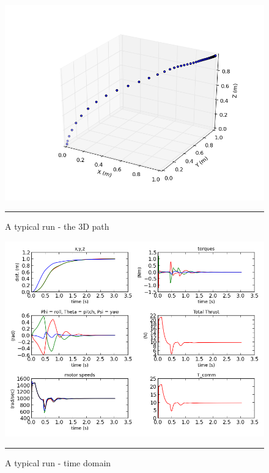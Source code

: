 \begin{figure}[htbp]
	\centering
		\includegraphics[width=\textwidth]{Figures/typical_run_time_3D_path.png}
		\rule{35em}{0.5pt}
	\caption[typical run 3D path]{A typical run - the 3D path}
	\label{fig:typical run 3D path}
\end{figure}

\begin{figure}[htbp]
	\centering
		\includegraphics[width=\textwidth]{Figures/typical_run_time_domain.png}
		\rule{35em}{0.5pt}
	\caption[typical run time domain]{A typical run - time domain}
	\label{fig:typical run time domain}
\end{figure}


